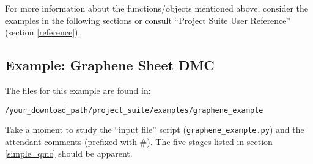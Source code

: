 \documentclass[oneside,11pt]{memoir}
\numberwithin{equation}{section}
\begin{document}
For more information about the functions/objects mentioned above, consider 
the examples in the following sections or consult ``Project Suite User 
Reference'' (section \ref{reference}).


\pagebreak
\subsection{Example: Graphene Sheet DMC} \label{graphene_dmc}
The files for this example are found in:
\begin{shaded}
\begin{verbatim}
/your_download_path/project_suite/examples/graphene_example
\end{verbatim}
\end{shaded}

Take a moment to study the ``input file'' script 
(\texttt{graphene\_example.py}) and the attendant comments 
(prefixed with \#). The five stages listed in section \ref{simple_qmc} should 
be apparent.
\end{document}
